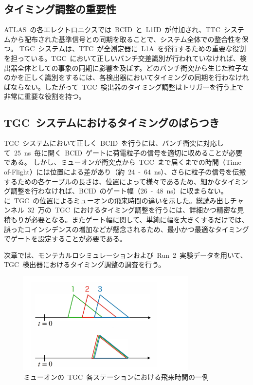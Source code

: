 \subsection{タイミング調整の重要性}
ATLAS~の各エレクトロニクスでは~BCID~と~L1ID~が付加され、TTC~システムから配布された基準信号との同期を取ることで、システム全体での整合性を保つ。
TGC~システムは、TTC~が全測定器に~L1A~を発行するための重要な役割を担っている。TGC~において正しいバンチ交差識別が行われていなければ、検出器全体としての事象の同期に影響を及ぼす。どのバンチ衝突から生じた粒子なのかを正しく識別をするには、各検出器においてタイミングの同期を行わなければならない。したがって~TGC~検出器のタイミング調整はトリガーを行う上で非常に重要な役割を持つ。

\subsection{TGC~システムにおけるタイミングのばらつき}
TGC~システムにおいて正しく~BCID~を行うには、バンチ衝突に対応して~25~ns~毎に開く~BCID~ゲートに荷電粒子の信号を適切に収めることが必要である。
しかし、ミューオンが衝突点から~TGC~まで届くまでの時間（Time-of-Flight）には位置による差があり（約~24~-~64~ns）、さらに粒子の信号を伝搬するための各ケーブルの長さは、位置によって様々であるため、細かなタイミング調整を行わなければ、BCID~のゲート幅（26~-~48~ns）に収まらない。に~TGC~の位置によるミューオンの飛来時間の違いを示した。総読み出しチャンネル~32~万の~TGC~におけるタイミング調整を行うには、詳細かつ精密な見積もりが必要となる。またゲート幅に関して、単純に幅を大きくするだけでは、誤ったコインシデンスの増加などが懸念されるため、最小かつ最適なタイミングでゲートを設定することが必要である。

次章では、モンテカルロシミュレーションおよび~Run~2~実験データを用いて、TGC~検出器におけるタイミング調整の調査を行う。

\begin{figure}[H]
    \centering   
    \includegraphics[width=0.8\textwidth,page=8]{img/slide/slide.pdf}
    \caption{ミューオンの~TGC~各ステーションにおける飛来時間の一例}
    \label{fig:tof}
\end{figure}

